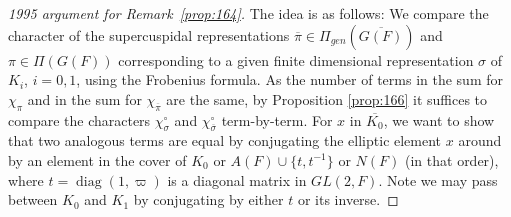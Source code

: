 \documentclass[12pt,letterpaper]{book}
\theoremstyle{plain}
\theoremstyle{definition}
\theoremstyle{remark}
\theoremstyle{remark}
\begin{document}
\begin{proof}[1995 argument for Remark~\ref{prop:164}]
The idea is as follows:
We compare the character of the supercuspidal representations
$\overline{\pi}\in \Pi_{gen}(\overline{G(F)})$ and
$\pi\in\Pi(G(F))$ corresponding to a given finite dimensional representation
$\sigma$ of $K_i$, $i=0,1$, using the Frobenius formula.
As the number of terms in the sum for $\chi_\pi$ and in
the sum for $\chi_{\overline{\pi}}$ are the same, by
Proposition \ref{prop:166} it suffices to compare the
characters $\chi_\sigma^\circ$
and $\chi_{\overline{\sigma}}^\circ$ term-by-term.
For $x$ in $\overline{K_0}$,
we want to show that two analogous terms are equal by
conjugating the elliptic element $x$ around by an element in the cover of
$K_0$ or $A(F)\cup \{t,t^{-1}\}$ or $N(F)$ (in that order), where
$t=\operatorname{diag}(1,\varpi)$ is a diagonal matrix in $GL(2,F)$.
Note we may pass between $K_0$ and $K_1$ by conjugating by either
$t$ or its inverse.


\end{proof}
\end{document}
